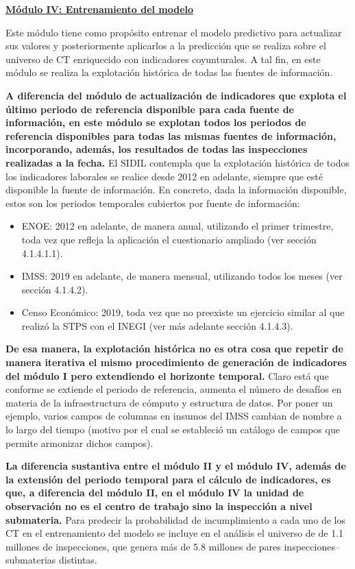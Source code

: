 \documentclass[
]{article}
\begin{document}
\ul{\textbf{Módulo IV: Entrenamiento del modelo}}

Este módulo tiene como propósito entrenar el modelo predictivo para actualizar sus valores y posteriormente aplicarlos a la predicción que se realiza sobre el universo de CT enriquecido con indicadores coyunturales. A tal fin, en este módulo se realiza la explotación histórica de todas las fuentes de información.

\textbf{A diferencia del módulo de actualización de indicadores que explota el último periodo de referencia disponible para cada fuente de información, en este módulo se explotan todos los periodos de referencia disponibles para todas las mismas fuentes de información, incorporando, además, los resultados de todas las inspecciones realizadas a la fecha.} El SIDIL contempla que la explotación histórica de todos los indicadores laborales se realice desde 2012 en adelante, siempre que esté disponible la fuente de información. En concreto, dada la información disponible, estos son los periodos temporales cubiertos por fuente de información:

\begin{itemize}
\item
  ENOE: 2012 en adelante, de manera anual, utilizando el primer trimestre, toda vez que refleja la aplicación el cuestionario ampliado (ver sección 4.1.4.1.1).
\item
  IMSS: 2019 en adelante, de manera mensual, utilizando todos los meses (ver sección 4.1.4.2).
\item
  Censo Económico: 2019, toda vez que no preexiste un ejercicio similar al que realizó la STPS con el INEGI (ver más adelante sección 4.1.4.3).
\end{itemize}

\textbf{De esa manera, la explotación histórica no es otra cosa que repetir de manera iterativa el mismo procedimiento de generación de indicadores del módulo I pero extendiendo el horizonte temporal.} Claro está que conforme se extiende el periodo de referencia, aumenta el número de desafíos en materia de la infraestructura de cómputo y estructura de datos. Por poner un ejemplo, varios campos de columnas en insumos del IMSS cambian de nombre a lo largo del tiempo (motivo por el cual se estableció un catálogo de campos que permite armonizar dichos campos).

\textbf{La diferencia sustantiva entre el módulo II y el módulo IV, además de la extensión del periodo temporal para el cálculo de indicadores, es que, a diferencia del módulo II, en el módulo IV la unidad de observación no es el centro de trabajo sino la inspección a nivel submateria.} Para predecir la probabilidad de incumplimiento a cada uno de los CT en el entrenamiento del modelo se incluye en el análisis el universo de de 1.1 millones de inspecciones, que genera más de 5.8 millones de pares inspecciones--submaterias distintas.
\end{document}
